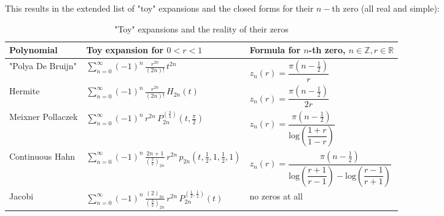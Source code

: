 \documentclass[a4paper,11pt,twoside]{amsart}
\begin{document}
\begin{itemize}
This results in the extended list of "toy" expansions and the closed forms for their $n-$th zero (all real and simple):
\begin{table}[H]
  \begin{center}
    \caption{"Toy" expansions and the reality of their zeros}
    \label{tab:tablezeros}
    \begin{tabular}{l|l|l|} 
      Polynomial & Toy expansion for $0 < r < 1$ & Formula for  $n$-th zero, $ n \in \mathbb{Z}, r \in \mathbb{R}$\\
      \hline
      "Polya De Bruijn" & $\displaystyle \sum_{n=0}^\infty (-1)^n\, \frac{ r^{2n}}{(2n)!}\,t^{2n}$  &$\displaystyle z_n(r) = \dfrac{\pi  \left(n-\frac12\right)}{r}$ \\       
      Hermite & $\displaystyle \sum_{n=0}^\infty (-1)^n\, \frac{ r^{2n}}{(2n)!}\, H_{2n}\left(t\right)$  &$\displaystyle z_n(r) = \dfrac{\pi  \left(n-\frac12\right)}{2r}$ \\
      Meixner Pollaczek & $\displaystyle \sum_{n=0}^\infty (-1)^n\, r^{2n}\, P_{2n}^{\left(\frac34\right)}\left(t, \frac{\pi}{2}\right)$ &  $\displaystyle z_n(r) = \dfrac{\pi  \left(n-\frac12\right)}{\mathrm{log}\! \left(\dfrac{1+r}{1-r}\right)}$\\
      Continuous Hahn & $\displaystyle \sum_{n=0}^\infty (-1)^n\, \frac{2n+1}{\left(\frac32\right)_{2n}}\,r^{2n}\,p_{2n}\left(t,\frac12,1,\frac12,1\right)$  & $\displaystyle z_n(r) = \dfrac{\pi  \left(n-\frac12\right)}{\mathrm{log}\! \left(\dfrac{r +1}{r-1}\right)-\mathrm{log}\! \left(\dfrac{r-1}{r+1}\right)}$\\
     Jacobi & $\displaystyle \sum_{n=0}^\infty (-1)^n\, \frac{(2)_{2n}}{\left(\frac32\right)_{2n}}\,r^{2n}\,P_{2n}^{\left(\frac12,\frac12\right)}(t)$  & no zeros at all\\
    \end{tabular}
  \end{center}
\end{table}

\pagebreak
\end{itemize}
\end{document}
